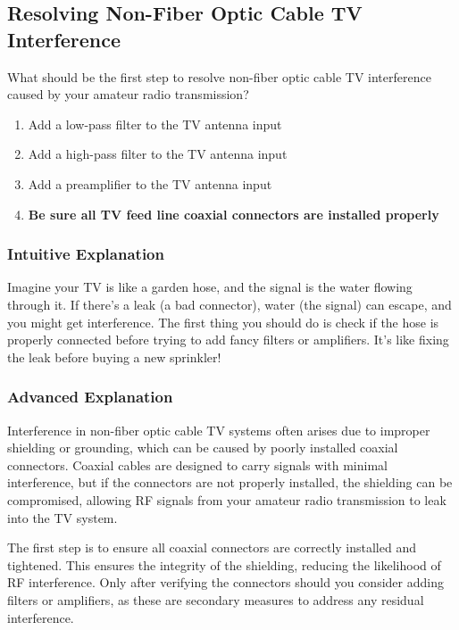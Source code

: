 \subsection{Resolving Non-Fiber Optic Cable TV Interference}
\label{T7B09}

\begin{tcolorbox}[colback=gray!10!white,colframe=black!75!black,title=T7B09]
What should be the first step to resolve non-fiber optic cable TV interference caused by your amateur radio transmission?
\begin{enumerate}[label=\Alph*)]
    \item Add a low-pass filter to the TV antenna input
    \item Add a high-pass filter to the TV antenna input
    \item Add a preamplifier to the TV antenna input
    \item \textbf{Be sure all TV feed line coaxial connectors are installed properly}
\end{enumerate}
\end{tcolorbox}

\subsubsection{Intuitive Explanation}
Imagine your TV is like a garden hose, and the signal is the water flowing through it. If there’s a leak (a bad connector), water (the signal) can escape, and you might get interference. The first thing you should do is check if the hose is properly connected before trying to add fancy filters or amplifiers. It’s like fixing the leak before buying a new sprinkler!

\subsubsection{Advanced Explanation}
Interference in non-fiber optic cable TV systems often arises due to improper shielding or grounding, which can be caused by poorly installed coaxial connectors. Coaxial cables are designed to carry signals with minimal interference, but if the connectors are not properly installed, the shielding can be compromised, allowing RF signals from your amateur radio transmission to leak into the TV system. 

The first step is to ensure all coaxial connectors are correctly installed and tightened. This ensures the integrity of the shielding, reducing the likelihood of RF interference. Only after verifying the connectors should you consider adding filters or amplifiers, as these are secondary measures to address any residual interference.


